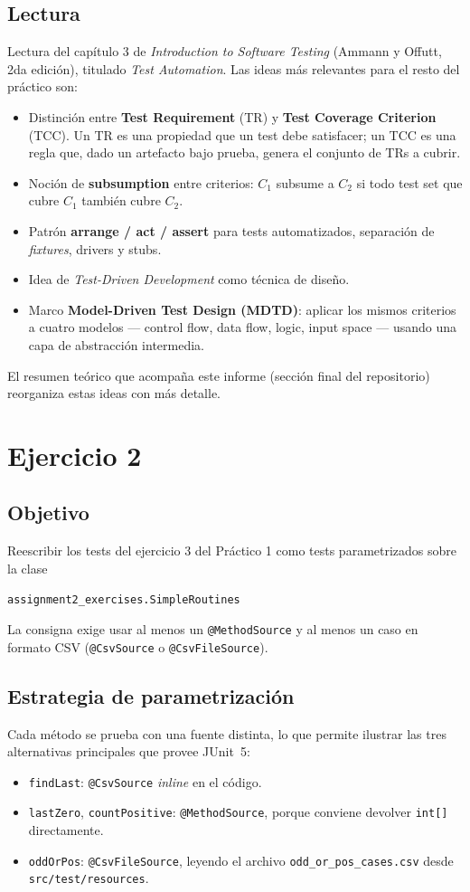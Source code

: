 \documentclass[12pt,a4paper]{article}
\begin{document}
\subsection{Lectura}
Lectura del capítulo 3 de \textit{Introduction to Software Testing} (Ammann y Offutt, 2da edición), titulado \textit{Test Automation}. Las ideas más relevantes para el resto del práctico son:
\begin{itemize}
  \item Distinción entre \textbf{Test Requirement} (TR) y \textbf{Test Coverage Criterion} (TCC). Un TR es una propiedad que un test debe satisfacer; un TCC es una regla que, dado un artefacto bajo prueba, genera el conjunto de TRs a cubrir.
  \item Noción de \textbf{subsumption} entre criterios: $C_1$ subsume a $C_2$ si todo test set que cubre $C_1$ también cubre $C_2$.
  \item Patrón \textbf{arrange / act / assert} para tests automatizados, separación de \textit{fixtures}, drivers y stubs.
  \item Idea de \textit{Test-Driven Development} como técnica de diseño.
  \item Marco \textbf{Model-Driven Test Design (MDTD)}: aplicar los mismos criterios a cuatro modelos --- control flow, data flow, logic, input space --- usando una capa de abstracción intermedia.
\end{itemize}
El resumen teórico que acompaña este informe (sección final del repositorio) reorganiza estas ideas con más detalle.

\section{Ejercicio 2}
\subsection{Objetivo}
Reescribir los tests del ejercicio 3 del Práctico 1 como tests parametrizados sobre la clase
\begin{center}
\texttt{assignment2\_exercises.SimpleRoutines}
\end{center}
La consigna exige usar al menos un \texttt{@MethodSource} y al menos un caso en formato CSV (\texttt{@CsvSource} o \texttt{@CsvFileSource}).

\subsection{Estrategia de parametrización}
Cada método se prueba con una fuente distinta, lo que permite ilustrar las tres alternativas principales que provee JUnit~5:
\begin{itemize}
  \item \texttt{findLast}: \texttt{@CsvSource} \textit{inline} en el código.
  \item \texttt{lastZero}, \texttt{countPositive}: \texttt{@MethodSource}, porque conviene devolver \texttt{int[]} directamente.
  \item \texttt{oddOrPos}: \texttt{@CsvFileSource}, leyendo el archivo \texttt{odd\_or\_pos\_cases.csv} desde \texttt{src/test/}\allowbreak\texttt{resources}.
\end{itemize}
\end{document}
